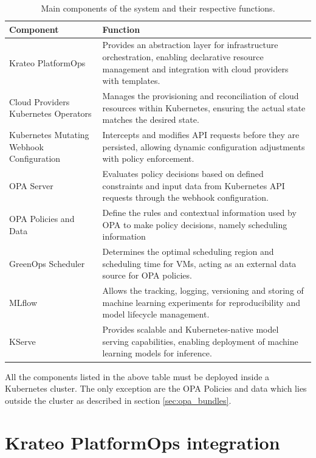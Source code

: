 \begin{table}[H]
  \centering
  \renewcommand{\arraystretch}{1.3} %
  \begin{tabularx}{\textwidth}{| l | X |} %
    \hline
    \textbf{Component} & \textbf{Function} \\
    \hline
    Krateo PlatformOps & Provides an abstraction layer for infrastructure orchestration, enabling declarative resource management and integration with cloud providers with templates. \\
    \hline
    Cloud Providers Kubernetes Operators & Manages the provisioning and reconciliation of cloud resources within Kubernetes, ensuring the actual state matches the desired state. \\
    \hline
    Kubernetes Mutating Webhook Configuration & Intercepts and modifies API requests before they are persisted, allowing dynamic configuration adjustments with policy enforcement. \\
    \hline
    OPA Server & Evaluates policy decisions based on defined constraints and input data from Kubernetes API requests through the webhook configuration. \\
    \hline
    OPA Policies and Data & Define the rules and contextual information used by OPA to make policy decisions, namely scheduling information \\
    \hline
    GreenOps Scheduler & Determines the optimal scheduling region and scheduling time for VMs, acting as an external data source for OPA policies. \\
    \hline
    MLflow & Allows the tracking, logging, versioning and storing of machine learning experiments for reproducibility and model lifecycle management. \\
    \hline
    KServe & Provides scalable and Kubernetes-native model serving capabilities, enabling deployment of machine learning models for inference. \\
    \hline
  \end{tabularx}
  \caption{Main components of the system and their respective functions.}
  \label{tab:system_components}
\end{table}

All the components listed in the above table must be deployed inside a Kubernetes cluster. The only exception are the OPA Policies and data which lies outside the cluster as described in section \ref{sec:opa_bundles}.

\section{Krateo PlatformOps integration}

